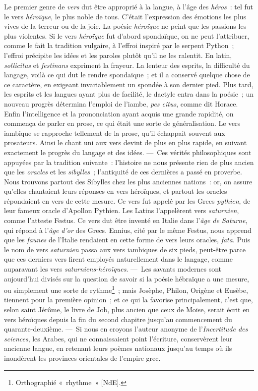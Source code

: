\documentclass[french,twoside]{book} %
\begin{document}
Le premier genre de {\itshape vers} dut être approprié à la langue, à l’âge des {\itshape héros} : tel fut le vers {\itshape héroïque}, le plus noble de tous. C’était l’expression des émotions les plus vives de la terreur ou de la joie. La poésie {\itshape héroïque} ne peint que les passions les plus violentes. Si le vers {\itshape héroïque} fut d’abord spondaïque, on ne peut l’attribuer, comme le fait la tradition vulgaire, à l’effroi inspiré par le serpent Python ; l’effroi précipite les idées et les paroles plutôt qu’il ne les ralentit. En latin, {\itshape sollicitus} et {\itshape festinans} expriment la frayeur. La lenteur des esprits, la difficulté du langage, voilà ce qui dut le rendre spondaïque ; et il a conservé quelque chose de ce caractère, en exigeant invariablement un spondée à son dernier pied. Plus tard, les esprits et les langues ayant plus de facilité, le dactyle entra dans la poésie ; un nouveau progrès détermina l’emploi de l’iambe, {\itshape pes citus}, comme dit Horace. Enfin l’intelligence et la prononciation  ayant acquis une grande rapidité, on commença de parler en prose, ce qui était une sorte de généralisation. Le vers iambique se rapproche tellement de la prose, qu’il échappait souvent aux prosateurs. Ainsi le chant uni aux vers devint de plus en plus rapide, en suivant exactement le progrès du langage et des idées. — Ces vérités philosophiques sont appuyées par la tradition suivante : l’histoire ne nous présente rien de plus ancien que les {\itshape oracles} et les {\itshape sibylles} ; l’antiquité de ces dernières a passé en proverbe. Nous trouvons partout des Sibylles chez les plus anciennes nations : or, on assure qu’elles chantaient leurs réponses en vers héroïques, et partout les oracles répondaient en vers de cette mesure. Ce vers fut appelé par les Grecs {\itshape pythien}, de leur fameux oracle d’Apollon Pythien. Les Latins l’appelèrent vers {\itshape saturnien}, comme l’atteste Festus. Ce vers dut être inventé en Italie dans l’{\itshape âge de Saturne}, qui répond à l’{\itshape âge d’or} des Grecs. Ennius, cité par le même Festus, nous apprend que les {\itshape faunes} de l’Italie rendaient en cette forme de vers leurs oracles, {\itshape fata}. Puis le nom de vers {\itshape saturnien} passa aux vers iambiques de six pieds, peut-être parce que ces derniers vers firent employés naturellement dans le langage, comme auparavant les vers {\itshape saturniens-héroïques}. — Les savants modernes sont aujourd’hui divisés sur la question de savoir si la poésie hébraïque a une mesure, ou simplement une sorte de rythme\footnote{Orthographié « rhythme » [NdE].} ; mais Josèphe, Philon, Origène et Eusèbe, tiennent pour la première opinion ;  et ce qui la favorise principalement, c’est que, selon saint Jérôme, le livre de Job, plus ancien que ceux de Moïse, serait écrit en vers héroïques depuis la fin du second chapitre jusqu’au commencement du quarante-deuxième. — Si nous en croyons l’auteur anonyme de l’{\itshape Incertitude des sciences}, les Arabes, qui ne connaissaient point l’écriture, conservèrent leur ancienne langue, en retenant leurs poèmes nationaux jusqu’au temps où ils inondèrent les provinces orientales de l’empire grec.\par
\end{document}
